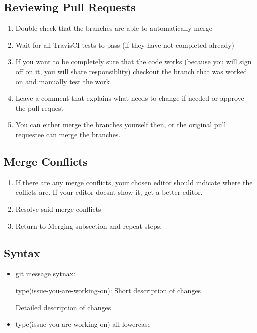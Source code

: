 \documentclass{article}
\begin{document}
		\subsection{Reviewing Pull Requests}
			\begin{enumerate}
				\item Double check that the branches are able to automatically merge
				\item Wait for all TravisCI tests to pass (if they have not completed already)
				\item If you want to be completely sure that the code works (because you will sign off on it, you will share responsiblity) checkout the branch that was worked on and manually test the work.
				\item Leave a comment that explains what needs to change if needed or approve the pull request
				\item You can either merge the branches yourself then, or the original pull requestee can merge the branches.
			\end{enumerate}
		\subsection{Merge Conflicts}
			\begin{enumerate}
				\item If there are any merge conflicts, your chosen editor should indicate where the coflicts are. If your editor doesnt show it, get a better editor.
				\item Resolve said merge conflicts
				\item Return to Merging subsection and repeat steps.
			\end{enumerate}
		\subsection{Syntax}
			\begin{itemize}
				\item git message sytnax:

				type(issue-you-are-working-on): Short description of changes

				Detailed description of changes
				\item type(issue-you-are-working-on) all lowercase
			\end{itemize}
\end{document}
